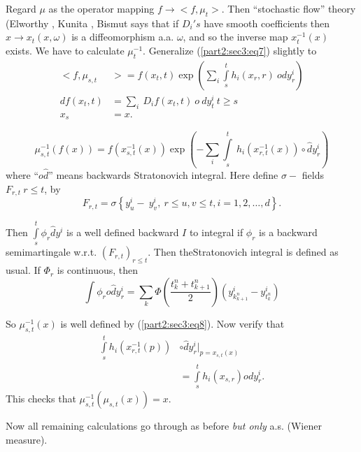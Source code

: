  Regard  $ \mu $ as the  operator mapping  $ f \rightarrow < f, \mu_t>
 $. Then ``stochastic flow'' theory  (Elworthy \cite{key13}, Kunita
 \cite{key17}, Bismut \cite{key2} says that if  $ D_i's $ have smooth 
 coefficients then  $ x \rightarrow x_t (x, \omega ) $ is  a
 diffeomorphism   a.a. $\omega$, and so the  inverse map $x^{-1}_t
 (x) $ exists. We have to calculate  $ \mu^{-1} _t $. Generalize
 (\ref{part2:sec3:eq7})  slightly to   
 \begin{align*}
   < f, \mu_{s,t }    &>   =  f (x_t,t ) \exp \left( \sum_{i} \int
   \limits^{t}_{s} h_i ( x_r,r ) ~ ody^i_r\right) \\ 
  df  ( x_t,t ) &=  \sum_{i} ~  D_i f( x_t,t ) ~ o ~ dy^i_t ~ t \ge s \\
  x_s &= x.
 \end{align*} 
 
\begin{prop}%
  \begin{equation}
    \mu^{-1}_{s,t} (f(x)) = f (x^{-1}_{s,t} (x))  \exp \left( -
    \sum_{i} \int\limits^{t}_{s} ~ h_i ( x^{-1}_{r,t}  (x)) \circ
    \hat{d}y^i_r \right)    \tag{8}\label{part2:sec3:eq8}  
  \end{equation}
  where ``$o \hat{d}$'' means  backwards Stratonovich integral. Here
  define $ \sigma - $ fields $ F_{r,t}~ r\leq t$, by 
  $$
  F_{r,t} = \sigma \left\{  y^i_u - ~ y^i_v, ~ r \leq u,v \leq t,i  = 1,2,
  \ldots, d \right\}. 
  $$
 
Then $ \int\limits^{t}_{s} \phi_r \hat{d} y^i $  is a  well
  defined  backward $I$  to integral if $ \phi_r $  is a
  backward semimartingale  w.r.t. $(F_{r,t})_{r \leq t} 
  $. Then the\pageoriginale Stratonovich integral is defined as
  usual. If $\Phi_r$ is  continuous, then 
  $$
  \int \phi_r o \hat{d} y^i_r = \sum_{k} \Phi \left( \frac{t^n_k
    +t^n_{k+1}}{2}\right) \left(y^{i}_{k^n_{k+1}}- y^i_{t^n_k}\right) 
  $$

  So $\mu^{-1}_{s,t}(x)$ is well defined by (\ref{part2:sec3:eq8}). Now verify that 
  \begin{align*}
  \int\limits_{s}^t h_i  \left(x^{-1}_{r,t}(p)\right) &\circ \hat{d}
  y^i_r \big|_{p =x_{s,t}(x)}\\ 
  & = \int\limits_{s}^t h_i(x_{s,r}) o d y^i_r.
  \end{align*}
  This checks that $\mu^{-1}_{s,t}(\mu_{s,t}(x)) =x$. 
\end{prop}
  
  Now all remaining calculations go through as before \textit{but only}
  a.s. (Wiener measure). 
  
